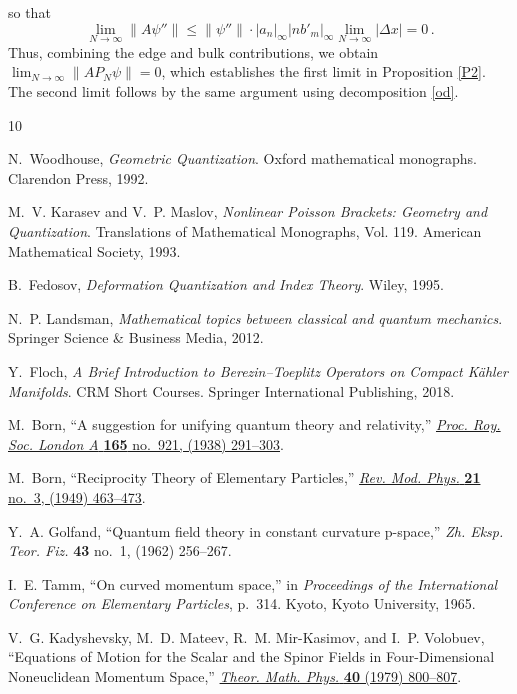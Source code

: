 \documentclass[12pt,a4paper]{article}
\numberwithin{equation}{section}
\theoremstyle{theorem}
\theoremstyle{remark}
\begin{document}
so that 
\begin{equation}
    \lim_{N\to \infty} \|A\psi''\|\leq \|\psi''\| \cdot |a_n|_\infty |n b'_m|_\infty \lim_{N\to \infty} |\Delta x|=0\,.
\end{equation}
Thus, combining the edge and bulk contributions, we obtain
$
    \lim_{N\to\infty}\|AP_N\psi\|=0
$,
which establishes the first limit in Proposition \ref{P2}.
The second limit follows by the same argument using  decomposition \ref{od}. 


\begin{thebibliography}{10}

N.~Woodhouse, {\em Geometric Quantization}.
\newblock Oxford mathematical monographs. Clarendon Press, 1992.

M.~V. Karasev and V.~P. Maslov, {\em Nonlinear Poisson Brackets: Geometry and Quantization}.
\newblock Translations of Mathematical Monographs, Vol. 119. American Mathematical Society, 1993.

B.~Fedosov, {\em Deformation Quantization and Index Theory}.
\newblock Wiley, 1995.

N.~P. Landsman, {\em Mathematical topics between classical and quantum mechanics}.
\newblock Springer Science \& Business Media, 2012.

Y.~Floch, {\em A Brief Introduction to Berezin--Toeplitz Operators on Compact K{\"a}hler Manifolds}.
\newblock CRM Short Courses. Springer International Publishing, 2018.

M.~Born, ``{A suggestion for unifying quantum theory and relativity},'' \href{http://dx.doi.org/10.1098/rspa.1938.0060}{{\em Proc. Roy. Soc. London A} {\bfseries 165} no.~921, (1938) 291--303}.

M.~Born, ``{Reciprocity Theory of Elementary Particles},'' \href{http://dx.doi.org/10.1103/revmodphys.21.463}{{\em Rev. Mod. Phys.} {\bfseries 21} no.~3, (1949) 463--473}.

Y.~A. Golfand, ``{Quantum field theory in constant curvature p-space},'' {\em Zh. Eksp. Teor. Fiz.} {\bfseries 43} no.~1, (1962) 256--267.

I.~E. Tamm, ``{On curved momentum space},'' in {\em {Proceedings of the International Conference on Elementary Particles}}, p.~314.
\newblock Kyoto, Kyoto University, 1965.

V.~G. Kadyshevsky, M.~D. Mateev, R.~M. Mir-Kasimov, and I.~P. Volobuev, ``{Equations of Motion for the Scalar and the Spinor Fields in Four-Dimensional Noneuclidean Momentum Space},'' \href{http://dx.doi.org/10.1007/BF01032066}{{\em Theor. Math. Phys.} {\bfseries 40} (1979) 800--807}.



\end{thebibliography}
\end{document}
